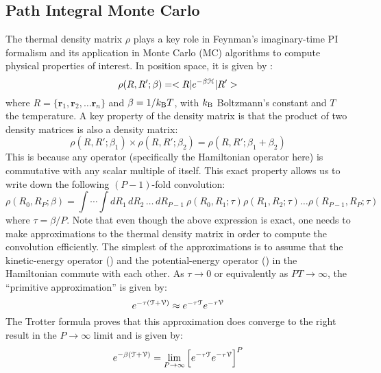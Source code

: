     \subsection{Path Integral Monte Carlo}
        The thermal density matrix $\rho$ plays a key role in Feynman's imaginary-time PI formalism and its application in Monte Carlo (MC) algorithms to compute physical properties of interest. In position space, it is given by \cite{Feynman,Ceperley1995,Cui1997}:
        \begin{equation}\label{eq:rho}
            \rho (R , R' ; \beta) = < R | e^{- \beta \text{$\mathcal{H}$} } | R' >
        \end{equation}
        where $R = \{\bm{r}_1, \bm{r}_2, \ldots \bm{r}_n\}$ and $\beta = 1/k_{\rm B}T$, with $k_{\rm B}$ Boltzmann's constant and $T$ the temperature. A key property of the density matrix is that the product of two density matrices is also a density matrix:
        \begin{equation}\label{eq:dmProduct}
            \rho (R, R'; \beta_1) \times \rho (R, R'; \beta_2) = \rho (R, R'; \beta_1 + \beta_2)
        \end{equation}
        This is because any operator (specifically the Hamiltonian operator  here) is commutative with any scalar multiple of itself. This exact property allows us to write down the following $(P-1)$-fold convolution:
        \begin{equation}\label{eq:convolution}
            \rho (R_0, R_P; \beta) = \displaystyle\int \cdots \int dR_1 \, dR_2 \, \ldots \, dR_{P-1} \: \rho (R_0, R_1; \tau) \rho (R_1, R_2; \tau) \ldots \rho (R_{P-1}, R_P; \tau)
        \end{equation}
        where $\tau = \beta/P$. Note that even though the above expression is exact, one needs to make approximations to the thermal density matrix in order to compute the convolution efficiently. The simplest of the approximations is to assume that the kinetic-energy operator () and the potential-energy operator () in the Hamiltonian commute with each other. As $\tau \to 0$ or equivalently as $PT \to \infty$, the ``primitive approximation'' is given by:
        \begin{equation}\label{eq:primitiveApprox}
            e^{- \tau (\text{$\mathcal{T}$} + \text{$\mathcal{V}$})} \approx e^{- \tau \text{$\mathcal{T}$}} e^{- \tau \text{$\mathcal{V}$}}
        \end{equation}
        The Trotter formula proves that this approximation does converge to the right result in the $P \to \infty$ limit and is given by:
        \begin{equation}\label{eq:trotter}
            e^{- \beta (\text{$\mathcal{T}$} + \text{$\mathcal{V}$})} = \lim_{P \to \infty} \Big[ e^{- \tau \text{$\mathcal{T}$}} e^{- \tau \text{$\mathcal{V}$}} \Big]^P
        \end{equation}

